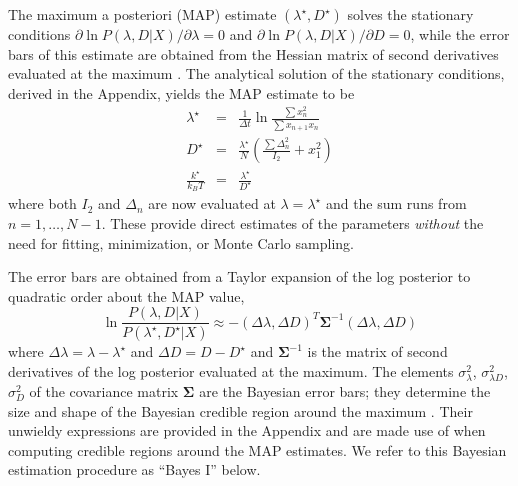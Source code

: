 \documentclass[english,aps, onecolumn, prl,superscriptaddress, notitlepage]{revtex4-1}
\begin{document}
The maximum a posteriori (MAP) estimate $(\lambda^{\star},D^{\star})$
solves the stationary conditions $\partial\ln P(\lambda,D|X)/\partial\lambda=0$
and $\partial\ln P(\lambda,D|X)/\partial D=0$, while the error bars
of this estimate are obtained from the Hessian matrix of second derivatives
evaluated at the maximum \cite{jeffreys1998theory,jaynes2003probability,sivia2006data}.
The analytical solution of the stationary conditions, derived in the
Appendix, yields the MAP estimate to be\begin{subequations}\label{eq:map-estimate}
\begin{eqnarray}
\lambda^{\star} & = & \frac{1}{\Delta t}\ln\frac{\sum x_{n}^{2}}{\sum x_{n+1}x_{n}}\\
D^{\star} & = & \frac{\lambda^{\star}}{N}\left(\frac{\sum\Delta_{n}^{2}}{I_{2}}+x_{1}^{2}\right)\\
\frac{k^{\star}}{k_{B}T} & = & \frac{\lambda^{\star}}{D^{\star}}
\end{eqnarray}
\end{subequations}where both $I_{2}$ and $\Delta_{n}$ are now evaluated
at $\lambda=\lambda^{\star}$ and the sum runs from $n=1,\ldots,N-1$.
These provide direct estimates of the parameters \emph{without} the
need for fitting, minimization, or Monte Carlo sampling. 

The error bars are obtained from a Taylor expansion of the log posterior
to quadratic order about the MAP value,
\begin{equation}
\ln\frac{P(\lambda,D|X)}{P(\lambda^{\star},D^{\star}|X)}\approx-\left(\Delta\lambda,\Delta D\right)^{T}\mathbf{\boldsymbol{\Sigma}}^{-1}\left(\Delta\lambda,\Delta D\right)\label{eq:quadratic-form}
\end{equation}
where $\Delta\lambda=\lambda-\lambda^{\star}$ and $\Delta D=D-D^{\star}$
and $\boldsymbol{\Sigma}^{-1}$ is the matrix of second derivatives
of the log posterior evaluated at the maximum. The elements $\sigma_{\lambda}^{2}$,
$\sigma_{\lambda D}^{2}$, $\sigma_{D}^{2}$ of the covariance matrix
$\boldsymbol{\Sigma}$ are the Bayesian error bars; they determine
the size and shape of the Bayesian credible region around the maximum
\cite{sivia2006data}. Their unwieldy expressions are provided in
the Appendix and are made use of when computing credible regions around
the MAP estimates. We refer to this Bayesian estimation procedure
as ``Bayes I'' below. 
\end{document}
